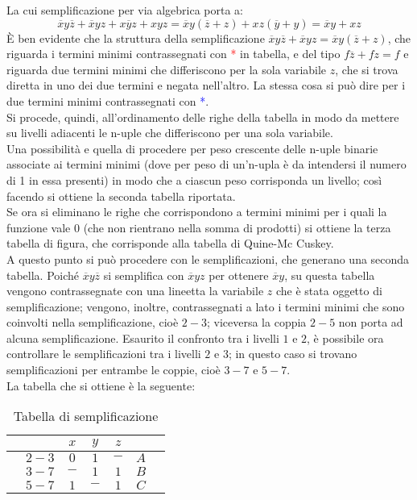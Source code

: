 \documentclass[a4paper]{extarticle}
\begin{document}
\noindent
La cui semplificazione per via algebrica porta a:
\[\overline{x}y\overline{z} + \overline{x}yz + x\overline{y}z + xyz = \overline{x}y(\overline{z} + z) + xz(\overline{y} + y) = \overline{x}y + xz\]
È ben evidente che la struttura della semplificazione \(\overline{x}y\overline{z} + \overline{x}yz = \overline{x}y(\overline{z} + z)\), che riguarda i termini minimi contrassegnati con \textcolor{red}{*} in tabella, e del tipo \(f\overline{z} + fz = f\) e riguarda due termini minimi che differiscono per la sola variabile \(z\), che si trova diretta in uno dei due termini e negata nell'altro. La stessa cosa si può dire per i due termini minimi contrassegnati con \textcolor{blue}{*}.\\
Si procede, quindi, all'ordinamento delle righe della tabella in modo da mettere su livelli adiacenti le n-uple che differiscono per una sola variabile.\\
Una possibilità e quella di procedere per peso crescente delle n-uple binarie associate ai termini minimi (dove per peso di un'n-upla è da intendersi il numero di 1 in essa presenti) in modo che a ciascun peso corrisponda un livello; così facendo si ottiene la seconda tabella riportata.\\
Se ora si eliminano le righe che corrispondono a termini minimi per i quali la funzione vale 0 (che non rientrano nella somma di prodotti) si ottiene la terza tabella di figura, che corrisponde alla tabella di Quine-Mc Cuskey.\\
A questo punto si può procedere con le semplificazioni, che generano una seconda tabella. Poiché \(\overline{x} y \overline{z}\) si semplifica con \(\overline{x}yz\) per ottenere
\(\overline{x}y\), su questa tabella vengono contrassegnate con una lineetta la variabile \(z\) che è stata oggetto di semplificazione; vengono, inoltre, contrassegnati a lato i termini minimi che sono coinvolti nella semplificazione, cioè \(2 - 3\); viceversa la coppia \(2 - 5\) non porta ad alcuna semplificazione. Esaurito il confronto tra i livelli \(1\) e \(2\), è possibile ora controllare le semplificazioni tra i livelli \(2\) e \(3\); in questo caso si trovano semplificazioni per entrambe le coppie, cioè \(3 - 7\) e \(5 - 7\).\\
La tabella che si ottiene è la seguente:

\begin{table}[H]
    \centering
    \setlength{\tabcolsep}{5pt}
    \begin{tabular}{c|c|ccc|cc}
         & $ $ & $x$ & $y$ & $z$ & $ $ & \\
         \hline
         & $2 - 3$ & $0$ & $1$ & $-$ & $A$ & \\
         \hline
         & $3 - 7$ & $-$ & $1$ & $1$ & $B$ & \\
         & $5 - 7$ & $1$ & $-$ & $1$ & $C$ & \\
    \end{tabular}
    \caption{Tabella di semplificazione}
    \label{tab:semplificazione_quine_mc_cuskey}
\end{table}
\end{document}

